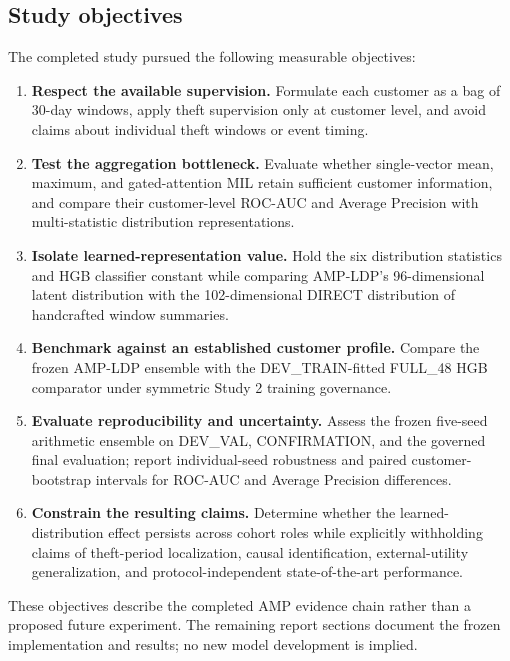 \subsection{Study objectives}

The completed study pursued the following measurable objectives:

\begin{enumerate}
  \item \textbf{Respect the available supervision.} Formulate each customer as a bag of 30-day windows, apply theft supervision only at customer level, and avoid claims about individual theft windows or event timing.
  \item \textbf{Test the aggregation bottleneck.} Evaluate whether single-vector mean, maximum, and gated-attention MIL retain sufficient customer information, and compare their customer-level ROC-AUC and Average Precision with multi-statistic distribution representations.
  \item \textbf{Isolate learned-representation value.} Hold the six distribution statistics and HGB classifier constant while comparing AMP-LDP's 96-dimensional latent distribution with the 102-dimensional DIRECT distribution of handcrafted window summaries.
  \item \textbf{Benchmark against an established customer profile.} Compare the frozen AMP-LDP ensemble with the DEV\_TRAIN-fitted FULL\_48 HGB comparator under symmetric Study 2 training governance.
  \item \textbf{Evaluate reproducibility and uncertainty.} Assess the frozen five-seed arithmetic ensemble on DEV\_VAL, CONFIRMATION, and the governed final evaluation; report individual-seed robustness and paired customer-bootstrap intervals for ROC-AUC and Average Precision differences.
  \item \textbf{Constrain the resulting claims.} Determine whether the learned-distribution effect persists across cohort roles while explicitly withholding claims of theft-period localization, causal identification, external-utility generalization, and protocol-independent state-of-the-art performance.
\end{enumerate}

These objectives describe the completed AMP evidence chain rather than a proposed future experiment. The remaining report sections document the frozen implementation and results; no new model development is implied.
